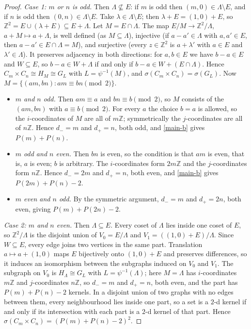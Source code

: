 \documentclass[11pt]{article}
\theoremstyle{plain}
\theoremstyle{definition}
\theoremstyle{remark}
\newcommand{\Z}{\mathbb{Z}}
\newcommand{\Per}{P}
\begin{document}
\begin{proof}
\emph{Case 1: $m$ or $n$ is odd.} Then $\Lambda \not\subseteq E$: if $m$ is odd then
$(m, 0) \in \Lambda \setminus E$, and if $n$ is odd then $(0, n) \in \Lambda \setminus E$.
Take $\lambda \in \Lambda \setminus E$; then $\lambda + E = (1,0) + E$, so
$\Z^2 = E \cup (\lambda + E) \subseteq E + \Lambda$. Let $M = E \cap \Lambda$. The map
$E/M \to \Z^2/\Lambda$, $a + M \mapsto a + \Lambda$, is well defined (as $M \subseteq
\Lambda$), injective (if $a - a' \in \Lambda$ with $a, a' \in E$, then $a - a' \in E \cap
\Lambda = M$), and surjective (every $z \in \Z^2$ is $a + \lambda'$ with $a \in E$ and
$\lambda' \in \Lambda$). It preserves adjacency in both directions: for $a, b \in E$ we have
$b - a \in E$ and $W \subseteq E$, so $b - a \in W + \Lambda$ if and only if
$b - a \in W + (E \cap \Lambda)$. Hence $C_m \times C_n \cong H_M \cong G_L$ with
$L = \psi^{-1}(M)$, and $\sigma(C_m \times C_n) = \sigma(G_L)$. Now
$M = \{(am, bn) : am \equiv bn \pmod 2\}$.
\begin{itemize}
  \item \emph{$m$ and $n$ odd.} Then $am \equiv a$ and $bn \equiv b \pmod 2$, so $M$ consists
        of the $(am, bn)$ with $a \equiv b \pmod 2$. For every $a$ the choice $b = a$ is
        allowed, so the $i$-coordinates of $M$ are all of $m\Z$; symmetrically the
        $j$-coordinates are all of $n\Z$. Hence $d_{-} = m$ and $d_{+} = n$, both odd, and
        \ref{main-b} gives $\Per(m) + \Per(n)$.
  \item \emph{$m$ odd and $n$ even.} Then $bn$ is even, so the condition is that $am$ is
        even, that is, $a$ is even; $b$ is arbitrary. The $i$-coordinates form $2m\Z$ and the
        $j$-coordinates form $n\Z$. Hence $d_{-} = 2m$ and $d_{+} = n$, both even, and
        \ref{main-b} gives $\Per(2m) + \Per(n) - 2$.
  \item \emph{$m$ even and $n$ odd.} By the symmetric argument, $d_{-} = m$ and
        $d_{+} = 2n$, both even, giving $\Per(m) + \Per(2n) - 2$.
\end{itemize}

\emph{Case 2: $m$ and $n$ even.} Then $\Lambda \subseteq E$. Every coset of $\Lambda$ lies
inside one coset of $E$, so $\Z^2/\Lambda$ is the disjoint union of $V_0 = E/\Lambda$ and
$V_1 = ((1,0) + E)/\Lambda$. Since $W \subseteq E$, every edge joins two vertices in the same
part. Translation $a \mapsto a + (1,0)$ maps $E$ bijectively onto $(1,0) + E$ and preserves
differences, so it induces an isomorphism between the subgraphs induced on $V_0$ and $V_1$.
The subgraph on $V_0$ is $H_\Lambda \cong G_L$ with $L = \psi^{-1}(\Lambda)$; here $M = \Lambda$
has $i$-coordinates $m\Z$ and $j$-coordinates $n\Z$, so $d_{-} = m$ and $d_{+} = n$, both
even, and the part has $\Per(m) + \Per(n) - 2$ kernels. In a disjoint union of two graphs with
no edges between them, every neighbourhood lies inside one part, so a set is a $2$-d kernel if
and only if its intersection with each part is a $2$-d kernel of that part. Hence
$\sigma(C_m \times C_n) = (\Per(m) + \Per(n) - 2)^2$.


\end{proof}
\end{document}
